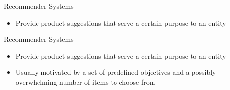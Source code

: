 \begin{frame}{Recommender Systems}
    \begin{itemize}
        \item Provide product suggestions that serve a certain purpose to an entity
    \end{itemize}
\end{frame}

\begin{frame}{Recommender Systems}
    \begin{itemize}
        \item Provide product suggestions that serve a certain purpose to an entity
        \item Usually motivated by a set  of  predefined objectives and a possibly  overwhelming number of items to choose from
    \end{itemize}
\end{frame}